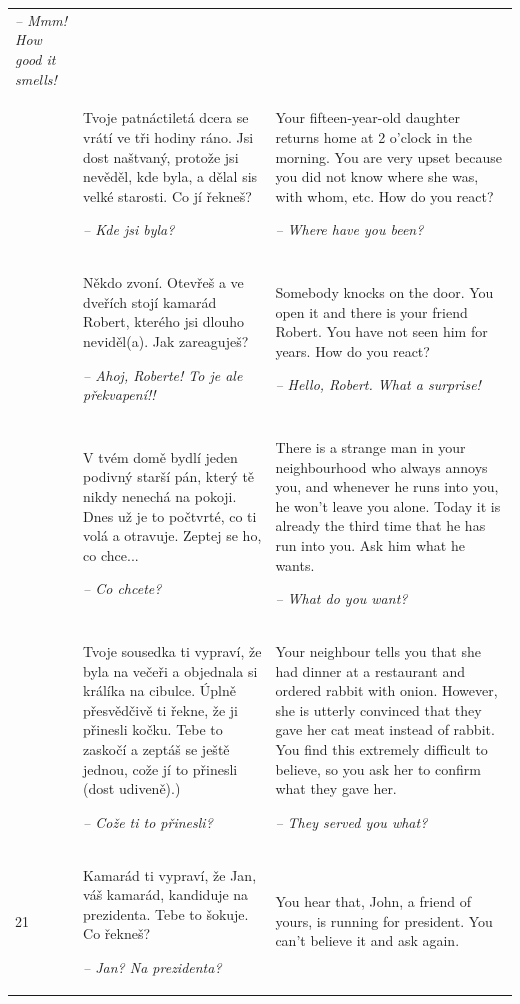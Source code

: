 \begin{xltabular}{\textwidth}{lQQ}
{\itshape -- Mmm! How good it smells!}\\
 & Tvoje patnáctiletá dcera se vrátí ve tři hodiny ráno. Jsi dost naštvaný, protože jsi nevěděl, kde byla, a dělal sis velké starosti. Co jí řekneš?

\textit{-- Kde jsi byla?} & Your fifteen-year-old daughter returns home at 2 o’clock in the morning. You are very upset because you did not know where she was, with whom, etc. How do you react?

{\itshape -- Where have you been?}\\
 & Někdo zvoní. Otevřeš a ve dveřích stojí kamarád Robert, kterého jsi dlouho neviděl(a). Jak zareaguješ?

{\itshape -- Ahoj, Roberte! To je ale překvapení!!} & Somebody knocks on the door. You open it and there is your friend Robert. You have not seen him for years. How do you react?

{\itshape -- Hello, Robert. What a surprise!}\\
 & V tvém domě bydlí jeden podivný starší pán, který tě nikdy nenechá na pokoji. Dnes už je to počtvrté, co ti volá a otravuje. Zeptej se ho, co chce...

\textit{-- Co chcete?} & There is a strange man in your neighbourhood who always annoys you, and whenever he runs into you, he won’t leave you alone. Today it is already the third time that he has run into you. Ask him what he wants.

{\itshape -- What do you want?}\\
 & Tvoje sousedka ti vypraví, že byla na večeři a objednala si králíka na cibulce. Úplně přesvědčivě ti řekne, že ji přinesli kočku. Tebe to zaskočí a zeptáš se ještě jednou, cože jí to přinesli (dost udiveně).)

\textit{-- Cože ti to přinesli?} & Your neighbour tells you that she had dinner at a restaurant and ordered rabbit with onion. However, she is utterly convinced that they gave her cat meat instead of rabbit. You find this extremely difficult to believe, so you ask her to confirm what they gave her.

{\itshape -- They served you what?}\\
21 & Kamarád ti vypraví, že Jan, váš kamarád, kandiduje na prezidenta. Tebe to šokuje. Co řekneš?

\textit{-- Jan? Na prezidenta?} & You hear that, John, a friend of yours, is running for president. You can’t believe it and ask again.


\end{xltabular}
